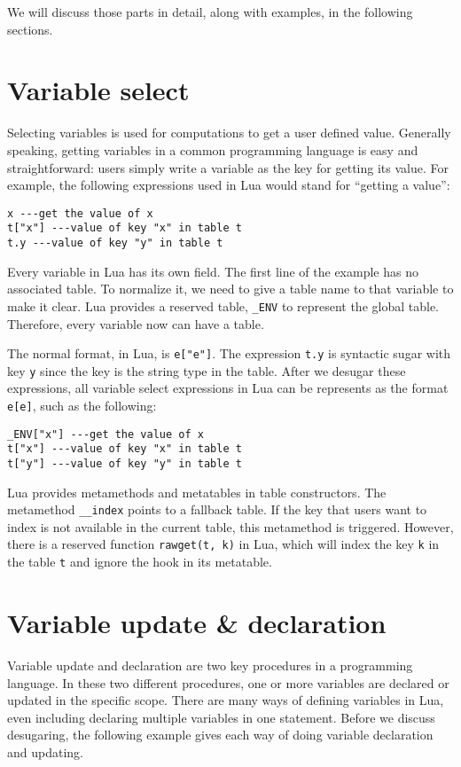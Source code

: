 We will discuss those parts in detail, along with examples, in the following sections.


\section{Variable select}
Selecting variables is used for computations to get a user defined value. Generally speaking, getting variables in a common programming language is easy and straightforward: users simply write a variable as the key for getting its value. For example, the following expressions used in Lua would stand for ``getting a value'':

\begin{verbatim}
x ---get the value of x
t["x"] ---value of key "x" in table t
t.y ---value of key "y" in table t
\end{verbatim}

Every variable in Lua has its own field. 
The first line of the example has no associated table.
To normalize it, we need to give a table name to that variable to make it clear.
Lua provides a reserved table, {\tt \_ENV} to represent the global table. Therefore, every variable now can have a table.

The normal format, in Lua, is {\tt e["e"]}. 
The expression {\tt t.y} is syntactic sugar with key {\tt y} since the key is the string type in the table. After we desugar these expressions, all variable select expressions in Lua can be represents as the format {\tt e[e]}, such as the following:

\begin{verbatim}
_ENV["x"] ---get the value of x
t["x"] ---value of key "x" in table t
t["y"] ---value of key "y" in table t
\end{verbatim}

Lua provides metamethods and metatables in table constructors. The metamethod {\tt \_\_index} points to a fallback table. If the key that users want to index is not available in the current table, this metamethod is triggered. However, there is a reserved function {\tt rawget(t, k)} in Lua, which will index the key {\tt k} in the table {\tt t} and ignore the hook in its metatable.

\section{Variable update \& declaration}\label{sec:desugarVarUpdate}
Variable update and declaration are two key procedures in a programming language. 
In these two different procedures, one or more variables are declared or updated in the specific scope. There are many ways of defining variables in Lua, even including declaring multiple variables in one statement. Before we discuss desugaring, the following example gives each way of doing variable declaration and updating.

